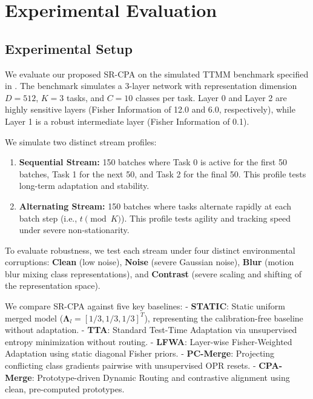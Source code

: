 \documentclass{article}
\theoremstyle{plain}
\theoremstyle{definition}
\theoremstyle{remark}
\begin{document}
\section{Experimental Evaluation}
\label{sec:experiments}

\subsection{Experimental Setup}
\label{subsec:setup}

We evaluate our proposed SR-CPA on the simulated TTMM benchmark specified in \cite{cpamerge2025}. The benchmark simulates a 3-layer network with representation dimension $D=512$, $K=3$ tasks, and $C=10$ classes per task. Layer 0 and Layer 2 are highly sensitive layers (Fisher Information of 12.0 and 6.0, respectively), while Layer 1 is a robust intermediate layer (Fisher Information of 0.1). 

We simulate two distinct stream profiles:
\begin{enumerate}
    \item \textbf{Sequential Stream:} 150 batches where Task 0 is active for the first 50 batches, Task 1 for the next 50, and Task 2 for the final 50. This profile tests long-term adaptation and stability.
    \item \textbf{Alternating Stream:} 150 batches where tasks alternate rapidly at each batch step (i.e., $t \pmod K$). This profile tests agility and tracking speed under severe non-stationarity.
\end{enumerate}

To evaluate robustness, we test each stream under four distinct environmental corruptions: \textbf{Clean} (low noise), \textbf{Noise} (severe Gaussian noise), \textbf{Blur} (motion blur mixing class representations), and \textbf{Contrast} (severe scaling and shifting of the representation space).

We compare SR-CPA against five key baselines:
- \textbf{STATIC}: Static uniform merged model ($\boldsymbol{\Lambda}_l = [1/3, 1/3, 1/3]^T$), representing the calibration-free baseline without adaptation.
- \textbf{TTA}: Standard Test-Time Adaptation via unsupervised entropy minimization without routing.
- \textbf{LFWA}: Layer-wise Fisher-Weighted Adaptation using static diagonal Fisher priors.
- \textbf{PC-Merge}: Projecting conflicting class gradients pairwise with unsupervised OPR resets.
- \textbf{CPA-Merge}: Prototype-driven Dynamic Routing and contrastive alignment using clean, pre-computed prototypes.
\end{document}
